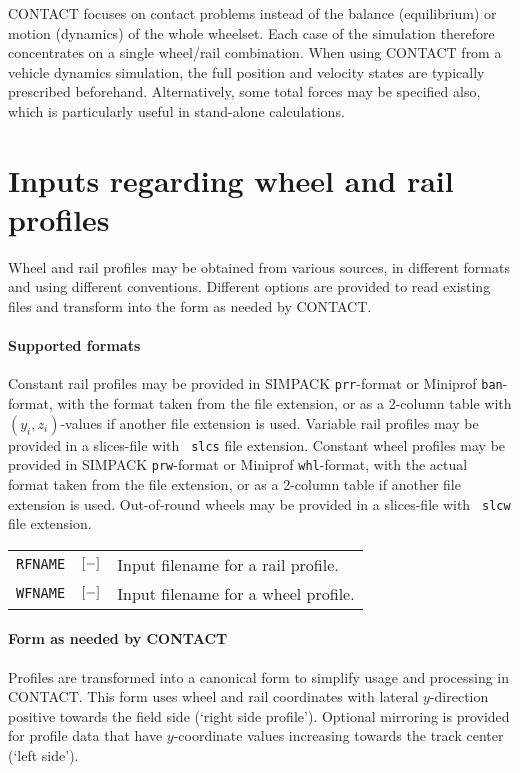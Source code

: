 \documentclass[12pt]{report}
\newenvironment{inputvars}{\vspace{0.4\baselineskip}%

\begin{tabular}{>{\raggedright}p{22mm}p{19mm}p{113mm}}}{
\end{tabular}

}
\newcommand{\inpvar}[3]{{\small\tt #1} & $#2$ & #3 \\[1ex]}
\begin{document}
CONTACT focuses on contact problems instead of the balance (equilibrium)
or motion (dynamics) of the whole wheelset. Each case of the simulation
therefore concentrates on a single wheel/rail combination. When using
CONTACT from a vehicle dynamics simulation, the full position and velocity
states are typically prescribed beforehand. Alternatively, some
total forces may be specified also, which is particularly useful in
stand-alone calculations.

\section{Inputs regarding wheel and rail profiles}
\label{sec:profiles}

Wheel and rail profiles may be obtained from various sources, in different
formats and using different conventions. Different options are provided
to read existing files and transform into the form as needed by CONTACT.

\paragraph{Supported formats}

Constant rail profiles may be provided in SIMPACK {\tt prr}-format or
Miniprof {\tt ban}-format, with the format taken from the file extension,
or as a 2-column table with $(y_i,z_i)$-values if another file extension is
used.  Variable rail profiles may be provided in a slices-file with {\tt
slcs} file extension. Constant wheel profiles may be provided in SIMPACK
{\tt prw}-format or Miniprof {\tt whl}-format, with the actual format taken
from the file extension, or as a 2-column table if another file extension
is used. Out-of-round wheels may be provided in a slices-file with {\tt
slcw} file extension.
\begin{inputvars}
\inpvar{RFNAME}{\bunit{-}}{Input filename for a rail profile.}
\inpvar{WFNAME}{\bunit{-}}{Input filename for a wheel profile.}
\end{inputvars}

\paragraph{Form as needed by CONTACT}

Profiles are transformed into a canonical form to simplify usage and
processing in CONTACT. This form uses wheel and rail coordinates with lateral
$y$-direction positive towards the field side (`right side profile').
Optional mirroring is provided for profile data that have $y$-coordinate
values increasing towards the track center (`left side').
\end{document}

